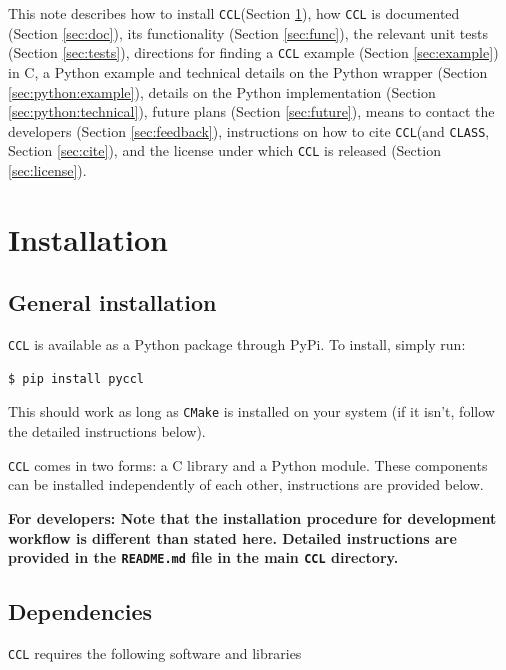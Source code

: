 \documentclass[\docopts]{\docclass}
\newcommand{\ccl}{{\tt CCL}\xspace}
\begin{document}
This note describes how to install \ccl (Section \ref{sec:install}), how \ccl is documented (Section \ref{sec:doc}), its functionality (Section \ref{sec:func}), the relevant unit tests (Section \ref{sec:tests}), directions for finding a \ccl example (Section \ref{sec:example}) in C, a Python example and technical details on the Python wrapper (Section \ref{sec:python:example}), details on the Python implementation (Section \ref{sec:python:technical}), future plans (Section \ref{sec:future}), means to contact the developers (Section \ref{sec:feedback}), instructions on how to cite \ccl (and {\tt CLASS}, Section \ref{sec:cite}), and the license under which \ccl is released (Section \ref{sec:license}).


\section{Installation}
\label{sec:install}

\subsection{General installation}

\ccl is available as a Python package through PyPi. To install, simply run:
\begin{verbatim}
$ pip install pyccl
\end{verbatim}
This should work as long as {\tt CMake} is installed on your system (if it isn't, follow the detailed instructions below).

\ccl comes in two forms: a C library and a Python module. These components can be installed independently of each other, instructions are provided below.

{\bf For developers: Note that the installation procedure for development workflow is different than stated here. Detailed instructions are provided in the {\tt README.md} file in the main \ccl directory.}

\subsection{Dependencies}

\ccl requires the following software and libraries
\end{document}
